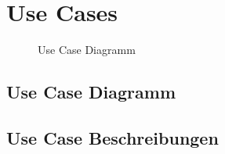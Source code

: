 \chapter{Use Cases}
\label{chap:usecases}

\begin{figure}[htbp]
	\centering
    
    \caption{Use Case Diagramm}
\end{figure}


\section{Use Case Diagramm}



\section{Use Case Beschreibungen}
\label{usecase:description}































